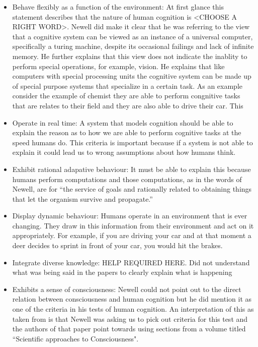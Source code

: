 \begin{itemize}
\item Behave flexibly as a function of the environment: At first
glance this statement describes that the nature of human cognition
is <CHOOSE A RIGHT WORD>. Newell did make it clear that he was referring
to the view that a cognitive system can be viewed as an instance of a
universal computer, specifically a turing machine, despite its occasional
failings and lack of infinite memory. He further explains that this
view does not indicate the inablity to perform special operations, for
example, vision. He explains that like computers with special
processing units the cognitive system can be made up of special
purpose systems that specialize in a certain task. As an example
consider the example of chemist they are able to perform congnitive
tasks that are relates to their field and they are also able to drive
their car. This 


\item Operate in real time: A system that models cognition should be
able to explain the reason as to how we are able to perform cognitive
tasks at the speed humans do. This criteria is important because if a
system is not able to explain it could lead us to wrong assumptions
about how humans think.


\item Exhibit rational adapative behaviour: It must be able to explain
this because humans perform computations and those computations, as in the words of
Newell\cite{Newell:1990aa}, are for ``the service of goals and
rationally related to obtaining things that let the organism survive
and propagate.''

\item Display dynamic behaviour: Humans operate in an
environment that is ever changing. They draw in this
information from their environment and act on it appropriately. For
example, if you are driving your car and at that moment a deer decides
to sprint in front of your car, you would hit the brakes. 

\item Integrate diverse knowledge: HELP REQUIRED HERE. Did not
understand what was being said in the papers to clearly explain what
is happening

\item Exhibits a sense of consciousness: Newell could not
point out to the direct relation between consciousness and human
cognition but he did mention it as one of the criteria in his tests of
human cognition. An interpretation of this as taken from
\cite{CambridgeJournals:207162} is that Newell was asking us to pick
out criteria for this test and the authors of that paper point towards
using sections from a volume titled ``Scientific approaches to
Consciousness".


\end{itemize}
